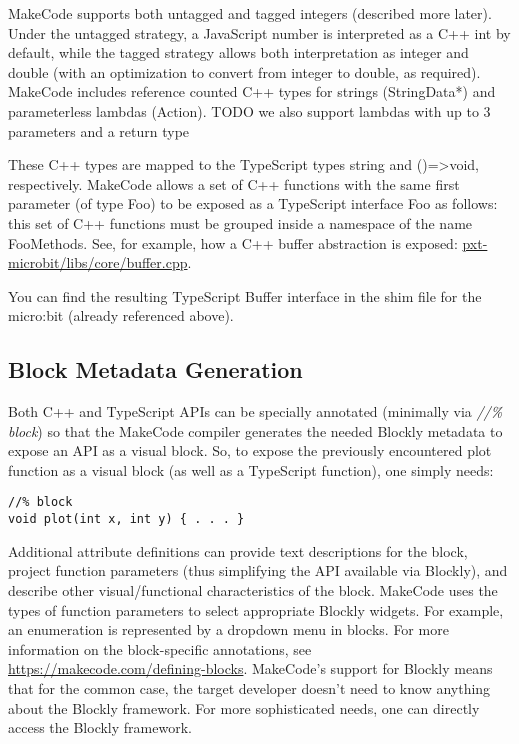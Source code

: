 MakeCode supports both untagged and tagged integers (described more later).  Under the untagged strategy,
a JavaScript number is interpreted as a C++ int by default, while the tagged strategy allows both
interpretation as integer and double (with an optimization to convert from integer to double, as required).  
MakeCode includes reference counted C++ types for strings (StringData*) and parameterless lambdas (Action).
TODO we also support lambdas with up to 3 parameters and a return type

These C++ types are mapped to the TypeScript types string and ()=>void, respectively.
MakeCode allows a set of C++ functions with the same first parameter (of type Foo) to be
exposed as a TypeScript interface Foo as follows: this set of C++ functions must be grouped
inside a namespace of the name FooMethods.  See, for example, how a C++ buffer abstraction is exposed:
\href{https://github.com/Microsoft/pxt-microbit/blob/master/libs/core/buffer.cpp}{pxt-microbit/libs/core/buffer.cpp}.

You can find the resulting TypeScript Buffer interface in the shim file for the micro:bit
(already referenced above). 

\subsection{Block Metadata Generation}

Both C++ and TypeScript APIs can be specially annotated (minimally via 
\emph{//\% block}) so that the MakeCode compiler generates the needed
Blockly metadata to expose an API as a visual block. So, to expose the previously
encountered plot function as a visual block (as well as a TypeScript function), one simply needs:
\begin{lstlisting}
//% block
void plot(int x, int y) { . . . }
\end{lstlisting}

Additional attribute definitions can provide text descriptions for the block, project function
parameters (thus simplifying the API available via Blockly), and describe other visual/functional
characteristics of the block.  MakeCode uses the types of function parameters to select appropriate
Blockly widgets.  For example, an enumeration is represented by a dropdown menu in blocks.
For more information on the block-specific annotations, see 
\url{https://makecode.com/defining-blocks}. 
MakeCode's support for Blockly means that for the common case, the target developer doesn't need
to know anything about the Blockly framework.  For more sophisticated needs, one can directly access
the Blockly framework. 

